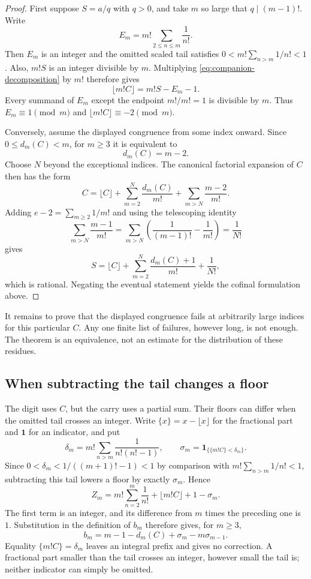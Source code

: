 \documentclass[11pt]{article}
\newcommand{\Ser}{S}
\begin{document}
\begin{proof}
First suppose $\Ser=a/q$ with $q>0$, and take $m$ so large that
$q\mid(m-1)!$.  Write
\[
 E_m=m!\sum_{2\le n\le m}\frac1{n!}.
\]
Then $E_m$ is an integer and the omitted scaled tail satisfies
$0<m!\sum_{n>m}1/n!<1$. Also, $m!\Ser$ is an integer divisible by $m$.  Multiplying \eqref{eq:companion-decomposition} by $m!$
therefore gives
\[
 \lfloor m!C\rfloor=m!\Ser-E_m-1.
\]
Every summand of $E_m$ except the endpoint $m!/m!=1$ is divisible by $m$.
Thus $E_m\equiv1\pmod m$ and
$\lfloor m!C\rfloor\equiv-2\pmod m$.

Conversely, assume the displayed congruence from some index onward. Since
$0\le d_m(C)<m$, for $m\ge3$ it is equivalent to
\[
 d_m(C)=m-2.
\]
Choose $N$ beyond the exceptional indices.  The canonical factorial
expansion of $C$ then has the form
\[
 C=\lfloor C\rfloor+
   \sum_{m=2}^{N}\frac{d_m(C)}{m!}+
   \sum_{m>N}\frac{m-2}{m!}.
\]
Adding $e-2=\sum_{m\ge2}1/m!$ and using the telescoping identity
\[
 \sum_{m>N}\frac{m-1}{m!}
 =\sum_{m>N}\left(\frac1{(m-1)!}-\frac1{m!}\right)
 =\frac1{N!}
\]
gives
\[
 \Ser=\lfloor C\rfloor+
   \sum_{m=2}^{N}\frac{d_m(C)+1}{m!}+\frac1{N!},
\]
which is rational.  Negating the eventual statement yields the cofinal
formulation above.
\end{proof}

\begin{remark}\label{bdry:companion-orbit-nonconcentration}
It remains to prove that the displayed congruence fails at arbitrarily
large indices for this particular $C$. Any one finite list of failures, however long, is not enough. The theorem is an equivalence, not an estimate for
the distribution of these residues.
\end{remark}

\subsection{When subtracting the tail changes a floor}\label{sec:digits}
The digit uses $C$, but the carry uses a partial sum. Their floors can
differ when the omitted tail crosses an integer. Write $\{x\}=x-\lfloor
x\rfloor$ for the fractional part and $\mathbf1$ for an indicator, and put
\[
\delta_m=m!\sum_{n>m}\frac1{n!(n!-1)},\qquad
\sigma_m=\mathbf1_{\{\{m!C\}<\delta_m\}}.
\]
Since $0<\delta_m<1/((m+1)!-1)<1$ by comparison with
$m!\sum_{n>m}1/n!<1$, subtracting this tail lowers a floor by exactly
$\sigma_m$. Hence
\[
 Z_m=m!\sum_{n=2}^m\frac1{n!}+\lfloor m!C\rfloor+1-\sigma_m.
\]
The first term is an integer, and its difference from $m$ times the
preceding one is $1$. Substitution in the definition of $b_m$ therefore
gives, for $m\ge3$,
\begin{equation}
b_m=m-1-d_m(C)+\sigma_m-m\sigma_{m-1}.
\label{eq:companion-wrap}
\end{equation}
Equality $\{m!C\}=\delta_m$ leaves an integral prefix and gives no
correction. A fractional part smaller than the tail crosses an integer,
however small the tail is; neither indicator can simply be omitted.
\end{document}
